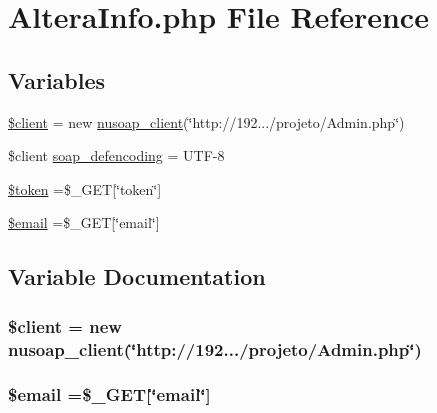\hypertarget{_altera_info_8php}{}\section{Altera\+Info.\+php File Reference}
\label{_altera_info_8php}
\subsection*{Variables}
\begin{DoxyCompactItemize}
\item 
\hyperlink{_altera_info_8php_ad1405dc1ba2e288764378e79bff7a87d}{\$client} = new \hyperlink{classnusoap__client}{nusoap\+\_\+client}(\char`\"{}http\+://192.../projeto/Admin.\+php\char`\"{})
\item 
\$client \hyperlink{_altera_info_8php_a944cce1b9c1aa5e93c77ace20ce99989}{soap\+\_\+defencoding} = \textquotesingle{}U\+T\+F-\/8\textquotesingle{}
\item 
\hyperlink{_altera_info_8php_a00ae4fcafb1145f5e968bdf920f83e2e}{\$token} =\$\+\_\+\+G\+E\+T\mbox{[}\char`\"{}token\char`\"{}\mbox{]}
\item 
\hyperlink{_altera_info_8php_ad634f418b20382e2802f80532d76d3cd}{\$email} =\$\+\_\+\+G\+E\+T\mbox{[}\char`\"{}email\char`\"{}\mbox{]}
\end{DoxyCompactItemize}


\subsection{Variable Documentation}
\hypertarget{_altera_info_8php_ad1405dc1ba2e288764378e79bff7a87d}{}
\subsubsection[{\$client}]{\setlength{\rightskip}{0pt plus 5cm}\$client = new {\bf nusoap\+\_\+client}(\char`\"{}http\+://192.../projeto/Admin.\+php\char`\"{})}\label{_altera_info_8php_ad1405dc1ba2e288764378e79bff7a87d}
\hypertarget{_altera_info_8php_ad634f418b20382e2802f80532d76d3cd}{}
\subsubsection[{\$email}]{\setlength{\rightskip}{0pt plus 5cm}\$email =\$\+\_\+\+G\+E\+T\mbox{[}\char`\"{}email\char`\"{}\mbox{]}}\label{_altera_info_8php_ad634f418b20382e2802f80532d76d3cd}
\hypertarget{_altera_info_8php_a00ae4fcafb1145f5e968bdf920f83e2e}{}

